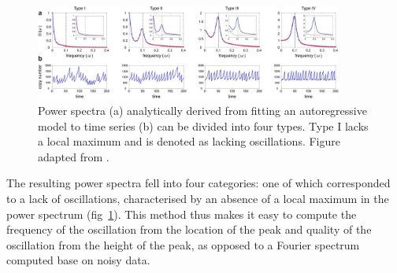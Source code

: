 \begin{figure}
  \centering
  \includegraphics[width=0.9\textwidth]{jiaFrequencyDomainAnalysis2020_2ab_adapted}
  \caption{
    Power spectra (a) analytically derived from fitting an autoregressive model to time series (b) can be divided into four types.
    Type I lacks a local maximum and is denoted as lacking oscillations.
    Figure adapted from \textcite{jiaFrequencyDomainAnalysis2020}.
  }
  \label{fig:analysis-ar-classification}
\end{figure}

The resulting power spectra fell into four categories: one of which corresponded to a lack of oscillations, characterised by an absence of a local maximum in the power spectrum (fig~\ref{fig:analysis-ar-classification}).
This method thus makes it easy to compute the frequency of the oscillation from the location of the peak and quality of the oscillation from the height of the peak, as opposed to a Fourier spectrum computed base on noisy data.

